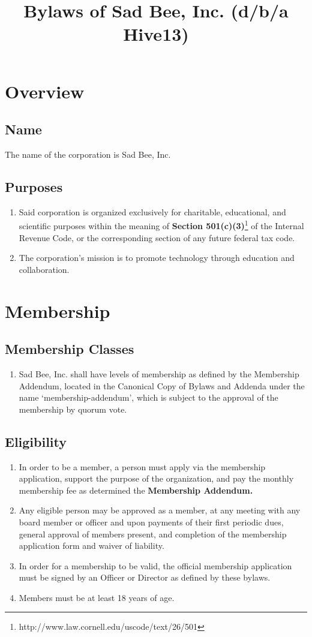 \documentclass{article}
\title{Bylaws of Sad Bee, Inc. (d/b/a Hive13)}
\begin{document}
\maketitle
\section{Overview}
\subsection{Name}
The name of the corporation is Sad Bee, Inc.
\subsection{Purposes}
\begin{enumerate}
    \item Said corporation is organized exclusively for charitable, educational,
    and scientific purposes within the meaning of
    \textbf{Section 501(c)(3)}\footnote{http://www.law.cornell.edu/uscode/text/26/501}
    of the Internal Revenue Code, or the corresponding section of any future
    federal tax code.
    \item The corporation's mission is to promote technology through education and collaboration.
\end{enumerate}
\section{Membership}
\subsection{Membership Classes}
\begin{enumerate}
  \item Sad Bee, Inc. shall have levels of membership as defined by the Membership Addendum,
  located in the Canonical Copy of Bylaws and Addenda under the name ‘membership-addendum’,
  which is subject to the approval of the membership by quorum vote.
\end{enumerate}
\subsection{Eligibility}
\begin{enumerate}
    \item In order to be a member, a person must apply via the membership application,
    support the purpose of the organization, and pay the monthly membership fee
    as determined the \textbf{Membership Addendum.}
    \item Any eligible person may be approved as a member, at any meeting with
    any board member or officer and upon payments of their first  periodic dues,
    general approval of members present, and completion of the membership application
    form and waiver of liability.
    \item In order for a membership to be valid, the official membership application
    must be signed by an Officer or Director as defined by these bylaws.
    \item Members must be at least 18 years of age.
\end{enumerate}
\end{document}
